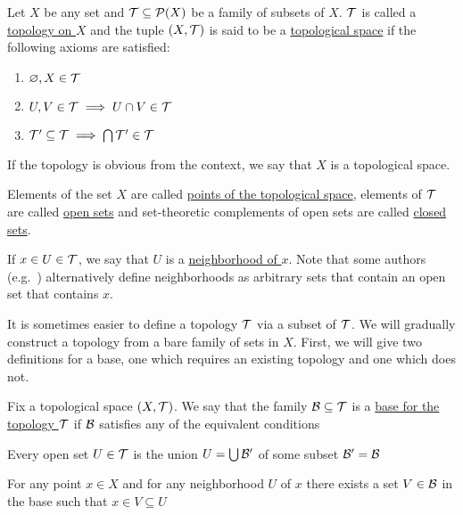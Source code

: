\begin{definition}\label{def:topological_space}\cite[21]{Lectures:general_topology}
  Let $X$ be any set and $\mathcal T \subseteq \operatorname{\mathcal P}(X)$ be a family of subsets of $X$. $\mathcal T$ is called a \uline{topology on $X$} and the tuple $(X, \mathcal T)$ is said to be a \uline{topological space} if the following axioms are satisfied:
  \begin{enumerate}[label={\textbf{O\arabic*)}}]
    \item\label{def:topological_space/O1} $\varnothing, X \in \mathcal T$
    \item\label{def:topological_space/O2} $U, V \in \mathcal T \implies U \cap V \in \mathcal T$
    \item\label{def:topological_space/O3} $\mathcal T' \subseteq \mathcal T \implies \bigcap \mathcal T' \in \mathcal T$
  \end{enumerate}

  If the topology is obvious from the context, we say that $X$ is a topological space.

  Elements of the set $X$ are called \uline{points of the topological space}, elements of $\mathcal T$ are called \uline{open sets} and set-theoretic complements of open sets are called \uline{closed sets}.

  If $x \in U \in \mathcal T$, we say that $U$ is a \uline{neighborhood of $x$}. Note that some authors (e.g.~\cite[38]{Kelley1955}) alternatively define neighborhoods as arbitrary sets that contain an open set that contains $x$.
\end{definition}

It is sometimes easier to define a topology $\mathcal T$ via a subset of $\mathcal T$. We will gradually construct a topology from a bare family of sets in $X$. First, we will give two definitions for a base, one which requires an existing topology and one which does not.

\begin{definition}\label{def:topological_space_base}\cite[23]{Lectures:general_topology}
  Fix a topological space $(X, \mathcal T)$. We say that the family $\mathcal B \subseteq \mathcal T$ is a \uline{base for the topology $\mathcal T$} if $\mathcal B$ satisfies any of the equivalent conditions
  \begin{defenum}
    \item\label{def:topological_space_base/union} Every open set $U \in \mathcal T$ is the union $U = \bigcup \mathcal B'$ of some subset $\mathcal B' = \mathcal B$
    \item\label{def:topological_space_base/existence} For any point $x \in X$ and for any neighborhood $U$ of $x$ there exists a set $V \in \mathcal B$ in the base such that $x \in V \subseteq U$
  \end{defenum}
\end{definition}


